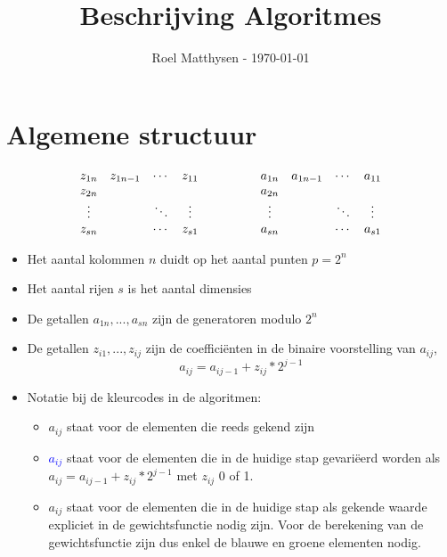 \documentclass[a4paper, 12pt]{article}
\title{Beschrijving Algoritmes}
\author{Roel Matthysen - \today}
\date{}
\begin{document}
\maketitle

\section*{Algemene structuur}
\begin{equation}
\begin{matrix}
z_{1n} & z_{1n-1} & \cdots & z_{11} \\
z_{2n} &  &  &  \\
\vdots & & \ddots & \vdots \\
z_{sn}& & \cdots  & z_{s1} \\
\end{matrix}
\mbox{\hspace{50pt}}
\begin{matrix}
a_{1n} & a_{1n-1} & \cdots & a_{11} \\
a_{2n} &  &  &  \\
\vdots & & \ddots & \vdots \\
a_{sn}& & \cdots  & a_{s1} \\
\end{matrix}
\end{equation}
\begin{itemize}
\item Het aantal kolommen $n$ duidt op het aantal punten $p=2^n$
\item Het aantal rijen $s$ is het aantal dimensies
\item De getallen $a_{1n},...,a_{sn}$ zijn de generatoren modulo $2^n$
\item De getallen $z_{i1},...,z_{ij}$ zijn de coeffici\"enten in de binaire voorstelling van $a_{ij}$, \begin{equation}
a_{ij}=a_{ij-1}+z_{ij}*2^{j-1} \end{equation}
\item Notatie bij de kleurcodes in de algoritmen: 
\begin{itemize}
\item \textcolor{RubineRed}{$a_{ij}$} staat voor de elementen die reeds gekend zijn 
\item \textcolor{blue}{$a_{ij}$} staat voor de elementen die in de huidige stap gevari\"eerd worden als $a_{ij}=a_{ij-1}+z_{ij}*2^{j-1}$ met $z_{ij}$ 0 of 1.
\item \textcolor{Emerald}{$a_{ij}$} staat voor de elementen die in de huidige stap als gekende waarde expliciet in de gewichtsfunctie nodig zijn. Voor de berekening van de gewichtsfunctie zijn dus enkel de blauwe en groene elementen nodig.
\end{itemize}
\end{itemize}
\clearpage
\end{document}
